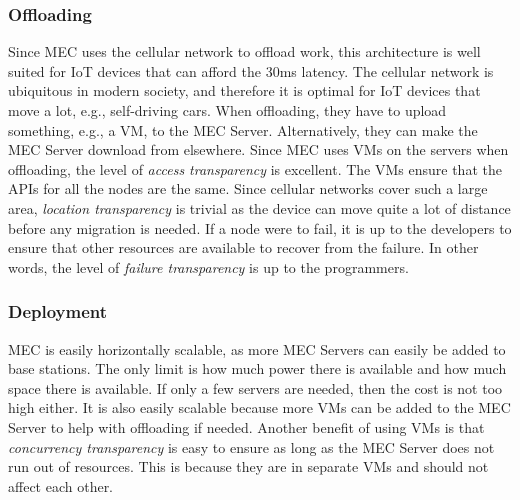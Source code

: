 \subsubsection{Offloading}
Since MEC uses the cellular network to offload work, this architecture is well suited for IoT devices that can afford the 30ms latency. The cellular network is ubiquitous in modern society, and therefore it is optimal for IoT devices that move a lot, e.g., self-driving cars. When offloading, they have to upload something, e.g., a VM, to the MEC Server. Alternatively, they can make the MEC Server download from elsewhere. Since MEC uses VMs on the servers when offloading, the level of \textit{access transparency} is excellent. The VMs ensure that the APIs for all the nodes are the same. Since cellular networks cover such a large area, \textit{location transparency} is trivial as the device can move quite a lot of distance before any migration is needed. If a node were to fail, it is up to the developers to ensure that other resources are available to recover from the failure. In other words, the level of \textit{failure transparency} is up to the programmers.

\subsubsection{Deployment}
MEC is easily horizontally scalable, as more MEC Servers can easily be added to base stations. The only limit is how much power there is available and how much space there is available. If only a few servers are needed, then the cost is not too high either. It is also easily scalable because more VMs can be added to the MEC Server to help with offloading if needed. Another benefit of using VMs is that \textit{concurrency transparency} is easy to ensure as long as the MEC Server does not run out of resources. This is because they are in separate VMs and should not affect each other.









